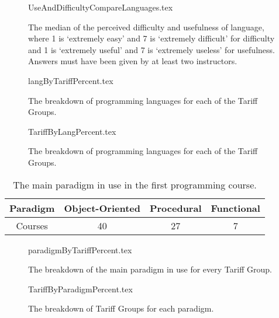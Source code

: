 \documentclass{sig-alternate}
\begin{document}
\begin{figure}
\begin{center}
{UseAndDifficultyCompareLanguages.tex}
\end{center}
\caption{The median of the perceived difficulty and usefulness of language, where 1 is `extremely easy' and 7 is `extremely difficult' for difficulty and 1 is `extremely useful' and 7 is `extremely useless' for usefulness.  Answers must have been given by at least two instructors.}
\end{figure}

\begin{figure}
\begin{center}
{langByTariffPercent.tex}
\end{center}
\caption{The breakdown of programming languages for each of the Tariff Groups.}
\end{figure}

\begin{figure}
\begin{center}
{TariffByLangPercent.tex}
\end{center}
\caption{The breakdown of programming languages for each of the Tariff Groups.}
\end{figure}


\begin{table}[]
\centering
\caption{The main paradigm in use in the first programming course.}
\label{tab:paradigm}
\begin{tabular}{cccc}
\hline
Paradigm & Object-Oriented & Procedural & Functional \\ \hline
Courses  & 40              & 27         & 7          \\ \hline
\end{tabular}
\end{table}

\clearpage

\begin{figure}
\begin{center}
{paradigmByTariffPercent.tex}
\end{center}
\caption{The breakdown of the main paradigm in use for every Tariff Group.}
\end{figure}

\begin{figure}
\begin{center}
{TariffByParadigmPercent.tex}
\end{center}
\caption{The breakdown of Tariff Groups for each paradigm.}
\end{figure}
\end{document}
